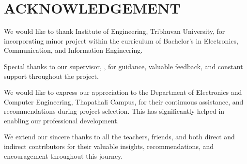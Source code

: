\chapter*{ACKNOWLEDGEMENT}
{}

We would like to thank Institute of Engineering, Tribhuvan University, for
incorporating minor project within the curriculum of Bachelor’s in Electronics, Communication, and Information Engineering.

Special thanks to our supervisor, \textbf{\cSupervisor}, for guidance, valuable feedback, and constant support throughout the project.

We would like to express our appreciation to the Department of Electronics and
Computer Engineering, Thapathali Campus, for their continuous assistance,
and recommendations during project selection. This has significantly helped in enabling our professional development.


We extend our sincere thanks to all the teachers, friends, and both direct and indirect contributors for their valuable insights, recommendations, and encouragement throughout this journey.

\vspace{1em}
\noindent \authorTable

